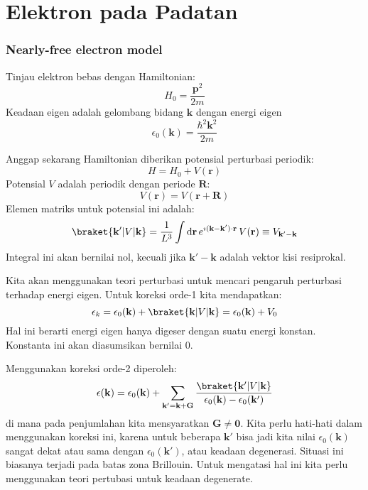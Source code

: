 \chapter{Elektron pada Padatan}

\subsection{Nearly-free electron model}

Tinjau elektron bebas dengan Hamiltonian:
\begin{equation}
H_{0} = \frac{\mathbf{p}^2}{2m}
\end{equation}
Keadaan eigen adalah gelombang bidang $\mathbf{k}$ dengan energi eigen
\begin{equation}
\epsilon_{0}(\mathbf{k}) = \frac{\hbar^2 \mathbf{k}^2}{2m}
\end{equation}

Anggap sekarang Hamiltonian diberikan potensial perturbasi periodik:
\begin{equation}
H = H_{0} + V(\mathbf{r})
\end{equation}
Potensial $V$ adalah periodik dengan periode $\mathbf{R}$:
\begin{equation}
V(\mathbf{r}) = V(\mathbf{r} + \mathbf{R})
\end{equation}
Elemen matriks untuk potensial ini adalah:
\begin{equation}
\braket{\mathbf{k}' | V | \mathbf{k} } =
\frac{1}{L^3} \int \mathrm{d}\mathbf{r}\, e^{\imath(\mathbf{k} - \mathbf{k}')\cdot
\mathbf{r}} \, V(\mathbf{r}) \equiv V_{\mathbf{k}' - \mathbf{k}}
\end{equation}
Integral ini akan bernilai nol, kecuali jika $\mathbf{k}' - \mathbf{k}$ adalah
vektor kisi resiprokal.

Kita akan menggunakan teori perturbasi untuk mencari pengaruh perturbasi terhadap
energi eigen.
Untuk koreksi orde-1 kita mendapatkan:
\begin{equation}
\epsilon_{k} = \epsilon_{0}(\mathbf{k}) + 
\braket{\mathbf{k} | V | \mathbf{k} } =
\epsilon_{0}(\mathbf{k}) + V_{0}
\end{equation}
Hal ini berarti energi eigen hanya digeser dengan suatu energi konstan.
Konstanta ini akan diasumsikan bernilai 0.

Menggunakan koreksi orde-2 diperoleh:
\begin{equation}
\epsilon(\mathbf{k}) = \epsilon_{0}(\mathbf{k}) +
\sum_{\mathbf{k}' = \mathbf{k} + \mathbf{G}}
\frac{\braket{\mathbf{k}' | V | \mathbf{k}}}
{\epsilon_{0}(\mathbf{k}) - \epsilon_{0}(\mathbf{k}')}
\end{equation}
di mana pada penjumlahan kita mensyaratkan $\mathbf{G} \neq \mathbf{0}$.
Kita perlu hati-hati dalam menggunakan koreksi ini, karena untuk beberapa
$\mathbf{k}'$ bisa jadi kita nilai $\epsilon_{0}(\mathbf{k})$
sangat dekat atau sama dengan $\epsilon_{0}(\mathbf{k}')$, atau keadaan degenerasi.
Situasi ini biasanya terjadi pada batas zona Brillouin. Untuk mengatasi hal ini
kita perlu menggunakan teori pertubasi untuk keadaan degenerate.

